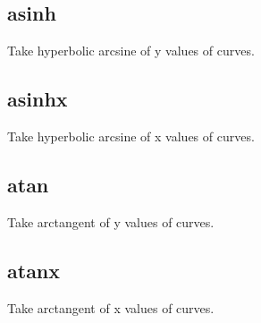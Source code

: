 \documentclass[letterpaper,10pt,english]{sphinxmanual}
\begin{document}
\subsection{asinh}
\label{\detokenize{math_operations:asinh}}
Take hyperbolic arcsine of y values of curves.

\begin{sphinxVerbatim}[commandchars=\\\{\}]
\PYG{p}{[}\PYG{p}{]}  
\end{sphinxVerbatim}


\subsection{asinhx}
\label{\detokenize{math_operations:asinhx}}
Take hyperbolic arcsine of x values of curves.

\begin{sphinxVerbatim}[commandchars=\\\{\}]
\PYG{p}{[}\PYG{p}{]}  
\end{sphinxVerbatim}


\subsection{atan}
\label{\detokenize{math_operations:atan}}
Take arctangent of y values of curves.

\begin{sphinxVerbatim}[commandchars=\\\{\}]
\PYG{p}{[}\PYG{p}{]}  
\end{sphinxVerbatim}


\subsection{atanx}
\label{\detokenize{math_operations:atanx}}
Take arctangent of x values of curves.

\begin{sphinxVerbatim}[commandchars=\\\{\}]
\PYG{p}{[}\PYG{p}{]}  
\end{sphinxVerbatim}
\end{document}
